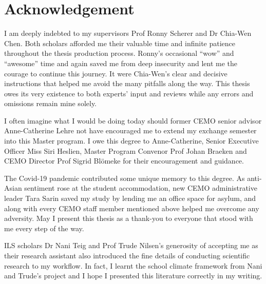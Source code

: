 \documentclass[a4paper,11pt,UKenglish,twoside,openright]{report}\usepackage[]{graphicx}\usepackage[]{color}
\begin{document}

\setcounter{page}{0}

\tableofcontents

\listoftables
\setcounter{page}{3}

\listoffigures
\setcounter{page}{4}



\doublespacing


\chapter*{Acknowledgement}
\label{Ac}

I am deeply indebted to my supervisors Prof Ronny Scherer and Dr Chia-Wen Chen. Both scholars afforded me their valuable time and infinite patience throughout the thesis production process. Ronny's occasional ``wow'' and ``awesome'' time and again saved me from deep insecurity and lent me the courage to continue this journey. It were Chia-Wen's clear and decisive instructions that helped me avoid the many pitfalls along the way. This thesis owes its very existence to both experts' input and reviews while any errors and omissions remain mine solely.

I often imagine what I would be doing today should former CEMO senior advisor Anne-Catherine Lehre not have encouraged me to extend my exchange semester into this Master program. I owe this degree to Anne-Catherine, Senior Executive Officer Miss Siri Heslien, Master Program Convenor Prof Johan Braeken and CEMO Director Prof Sigrid Bl{\"o}meke for their encouragement and guidance.

The Covid-19 pandemic contributed some unique memory to this degree. As anti-Asian sentiment rose at the student accommodation, new CEMO administrative leader Tara Sarin saved my study by lending me an office space for asylum, and along with every CEMO staff member mentioned above helped me overcome any adversity. May I present this thesis as a thank-you to everyone that stood with me every step of the way.

ILS scholars Dr Nani Teig and Prof Trude Nilsen's generosity of accepting me as their research assistant also introduced the fine details of conducting scientific research to my workflow. In fact, I learnt the school climate framework from Nani and Trude's project and I hope I presented this literature correctly in my writing.
\end{document}
